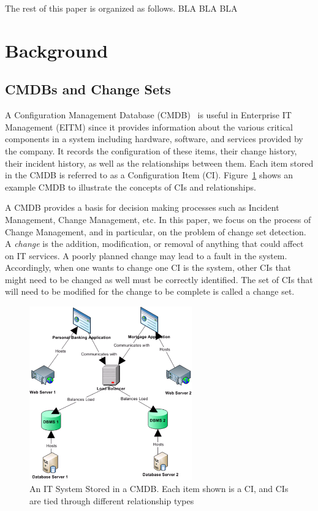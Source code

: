 \documentclass{article}
\begin{document}
The rest of this paper is organized as follows. BLA BLA BLA


\section{Background}

\subsection{CMDBs and Change Sets}
A Configuration Management Database (CMDB)~\cite{itil} is useful in Enterprise IT Management (EITM) since it provides information about the various critical
components in a
system including hardware, software, and services provided by the company. It records the configuration of these items, their change history, their incident
history, as well as the relationships between them. Each item stored in the CMDB is referred to as a Configuration Item (CI). Figure~\ref{fig:cmdbExample} shows
an example CMDB to illustrate the concepts of CIs and relationships.

A CMDB provides a basis for decision making processes such as Incident Management, Change Management, etc.  In this paper, we focus on the process of Change
Management, and in particular, on the problem of change set detection. A \textit{change} is the addition, modification, or removal of anything that could affect
on IT services. A poorly planned change may lead to a fault in the system. Accordingly, when one wants to change one CI is the system, other CIs that might
need to be changed as well must be correctly identified. The set of CIs that will need to be modified for the change to be complete is called a change set.

\begin{figure}[!t]
\centering
\includegraphics[width=7cm]{cmdbExample.PNG}
\caption{An IT System Stored in a CMDB. Each item shown is a CI, and CIs are tied through different relationship types}
\label{fig:cmdbExample}
\end{figure}
\end{document}
